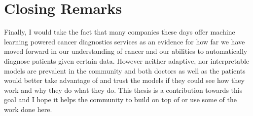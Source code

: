 \section{Closing Remarks}
Finally, I would take the fact that many companies these days offer machine
learning powered cancer diagnostics services as an evidence for how far we have
moved forward in our understanding of cancer and our abilities to automatically
diagnose patients given certain data. However neither adaptive, nor
interpretable models are prevalent in the community and both doctors as well as
the patients would better take advantage of and trust the models if they could
see how they work and why they do what they do. This thesis is a contribution
towards this goal and I hope it helps the community to build on top of or use
some of the work done here.
